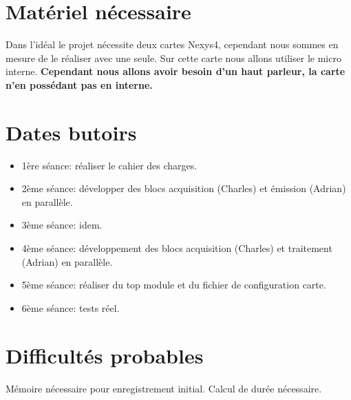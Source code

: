 \documentclass[paper=a4, fontsize=12pt]{article}
\numberwithin{equation}{section}		%
\numberwithin{figure}{section}			%
\numberwithin{table}{section}				%
\begin{document}
\section{Matériel nécessaire}

Dans l'idéal le projet nécessite deux cartes Nexys4, cependant nous sommes en mesure de le réaliser avec une seule. Sur cette carte nous allons utiliser le micro interne.
\textbf{Cependant nous allons avoir besoin d'un haut parleur, la carte n'en possédant pas en interne.}

\section{Dates butoirs}
\begin{itemize}[label=$\square$,leftmargin=* ,parsep=0cm,itemsep=0cm,topsep=0cm]
\item 1ère séance: réaliser le cahier des charges.
\item 2ème séance: développer des blocs acquisition (Charles) et émission (Adrian) en parallèle.
\item 3ème séance: idem.
\item 4ème séance: développement des blocs acquisition (Charles) et traitement (Adrian) en parallèle.
\item 5ème séance: réaliser du top module et du fichier de configuration carte.
\item 6ème séance: tests réel.
\end{itemize}
\section{Difficultés probables}
Mémoire nécessaire pour enregistrement initial. Calcul de durée nécessaire.

\end{document}
